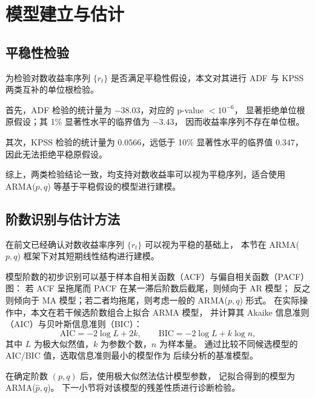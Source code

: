\documentclass[12pt]{article}
\theoremstyle{definition}
\begin{document}
\section{模型建立与估计}
\label{sec:model}

\subsection{平稳性检验}

为检验对数收益率序列 $\{r_t\}$ 是否满足平稳性假设，本文对其进行 ADF 与 KPSS
两类互补的单位根检验。

首先，ADF 检验的统计量为 $-38.03$，对应的 p-value $<10^{-6}$，
显著拒绝单位根原假设；其 1\% 显著性水平的临界值为 $-3.43$，
因而收益率序列不存在单位根。

其次，KPSS 检验的统计量为 $0.0566$，远低于 10\% 显著性水平的临界值 $0.347$，
因此无法拒绝平稳原假设。

综上，两类检验结论一致，均支持对数收益率可以视为平稳序列，适合使用
ARMA($p,q$) 等基于平稳假设的模型进行建模。


\subsection{阶数识别与估计方法}

在前文已经确认对数收益率序列 $\{r_t\}$ 可以视为平稳的基础上，
本节在 ARMA($p,q$) 框架下对其短期线性结构进行建模。

模型阶数的初步识别可以基于样本自相关函数（ACF）与偏自相关函数（PACF）图：
若 ACF 呈拖尾而 PACF 在某一滞后阶数后截尾，则倾向于 AR 模型；
反之则倾向于 MA 模型；若二者均拖尾，则考虑一般的 ARMA($p,q$) 形式。
在实际操作中，本文在若干候选阶数组合上拟合 ARMA 模型，
并计算其 Akaike 信息准则（AIC）与贝叶斯信息准则（BIC）：
\[
    \mathrm{AIC} = -2\log L + 2k,\qquad
    \mathrm{BIC} = -2\log L + k\log n,
\]
其中 $L$ 为极大似然值，$k$ 为参数个数，$n$ 为样本量。
通过比较不同候选模型的 AIC/BIC 值，选取信息准则最小的模型作为
后续分析的基准模型。

在确定阶数 $(p,q)$ 后，使用极大似然法估计模型参数，
记拟合得到的模型为 ARMA($\hat p,\hat q$)。
下一小节将对该模型的残差性质进行诊断检验。
\end{document}
